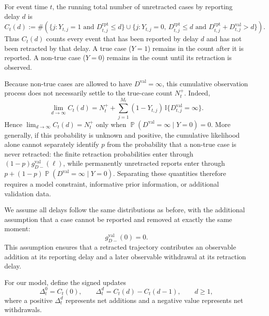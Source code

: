 \documentclass{article}
\theoremstyle{definition}
\theoremstyle{remark}
\newcommand{\Prb}{\operatorname{\mathbb{P}}}
\begin{document}
For event time $t$, the running total number of unretracted cases by reporting delay $d$ is
\begin{equation}\label{cumdef}
    C_t(d) := \#\left(
    \{j : Y_{t,j} = 1 \text{ and } D_{t,j}^{\text{rpt}} \leq d\}
    \cup
    \{j : Y_{t,j} = 0,\, D_{t,j}^{\text{rpt}} \leq d \text{ and } D_{t,j}^{\text{rpt}} + D_{t,j}^{\text{val}} > d\}
    \right).
\end{equation}
Thus $C_t(d)$ counts every event that has been reported by delay $d$ and has not been retracted by that delay. A true case ($Y=1$) remains in the count after it is reported. A non-true case ($Y=0$) remains in the count until its retraction is observed.

Because non-true cases are allowed to have $D^{\mathrm{val}}=\infty$, this cumulative observation process does not necessarily settle to the true-case count $N_t^+$. Indeed,
\begin{equation}\label{cumlimit}
    \lim_{d\to\infty} C_t(d)
    =
    N_t^+
    +
    \sum_{j=1}^{M_t}
    (1-Y_{t,j})\,
    \mathbb I\{D_{t,j}^{\mathrm{val}}=\infty\}.
\end{equation}
Hence $\lim_{d\to\infty}C_t(d)=N_t^+$ only when $\Prb(D^{\mathrm{val}}=\infty\mid Y=0)=0$. More generally, if this probability is unknown and positive, the cumulative likelihood alone cannot separately identify $p$ from the probability that a non-true case is never retracted: the finite retraction probabilities enter through $(1-p)g_{D-}^{\mathrm{val}}(\ell)$, while permanently unretracted reports enter through $p+(1-p)\Prb(D^{\mathrm{val}}=\infty\mid Y=0)$. Separating these quantities therefore requires a model constraint, informative prior information, or additional validation data.

We assume all delays follow the same distributions as before, with the additional assumption that a case cannot be reported and removed at exactly the same moment:
\begin{equation}\label{nozeroretraction}
    g_{D-}^{\mathrm{val}}(0) = 0.
\end{equation}
This assumption ensures that a retracted trajectory contributes an observable addition at its reporting delay and a later observable withdrawal at its retraction delay.

For our model, define the signed updates
\begin{equation}\label{signedupdates}
    \Delta^0_t = C_t(0),
    \qquad
    \Delta^d_t = C_t(d) - C_t(d-1), \qquad d\geq 1,
\end{equation}
where a positive $\Delta^d_t$ represents net additions and a negative value represents net withdrawals.
\end{document}
